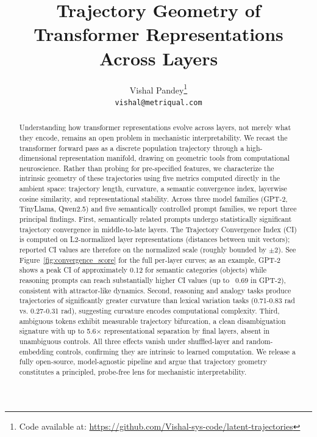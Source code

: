 \documentclass{article}
\title{Trajectory Geometry of Transformer Representations Across Layers}
\author{
  Vishal Pandey\thanks{Code available at: \url{https://github.com/Vishal-sys-code/latent-trajectories}}\\
  \texttt{vishal@metriqual.com} \\
}
\begin{document}
\maketitle


\begin{abstract}
Understanding how transformer representations evolve across layers, not merely what they encode, remains an open problem in mechanistic interpretability. We recast the transformer forward pass as a discrete population trajectory through a high-dimensional representation manifold, drawing on geometric tools from computational neuroscience. Rather than probing for pre-specified features, we characterize the intrinsic geometry of these trajectories using five metrics computed directly in the ambient space: trajectory length, curvature, a semantic convergence index, layerwise cosine similarity, and representational stability. Across three model families (GPT-2, TinyLlama, Qwen2.5) and five semantically controlled prompt families, we report three principal findings. First, semantically related prompts undergo statistically significant trajectory convergence in middle-to-late layers. The Trajectory Convergence Index (CI) is computed on L2-normalized layer representations (distances between unit vectors); reported CI values are therefore on the normalized scale (roughly bounded by $\pm2$). See Figure~\ref{fig:convergence_score} for the full per-layer curves; as an example, GPT-2 shows a peak CI of approximately 0.12 for semantic categories (objects) while reasoning prompts can reach substantially higher CI values (up to ~0.69 in GPT-2), consistent with attractor-like dynamics. Second, reasoning and analogy tasks produce trajectories of significantly greater curvature than lexical variation tasks (0.71-0.83 rad vs. 0.27-0.31 rad), suggesting curvature encodes computational complexity. Third, ambiguous tokens exhibit measurable trajectory bifurcation, a clean disambiguation signature with up to 5.6× representational separation by final layers, absent in unambiguous controls. All three effects vanish under shuffled-layer and random-embedding controls, confirming they are intrinsic to learned computation. We release a fully open-source, model-agnostic pipeline and argue that trajectory geometry constitutes a principled, probe-free lens for mechanistic interpretability.
\end{abstract}


\end{document}
